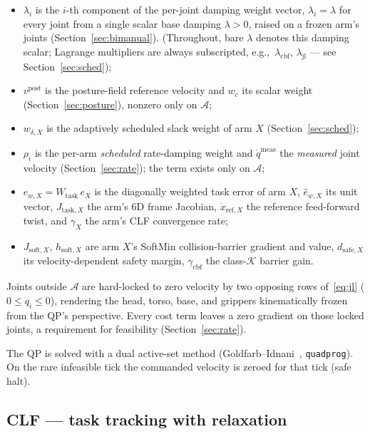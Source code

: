 \documentclass[12pt,a4paper,twoside,openright]{report}
\newcommand{\qdot}{\dot{q}}
\begin{document}
\begin{itemize}[nosep]
\item $\lambda_i$ is the $i$-th component of the per-joint damping weight vector, $\lambda_i = \lambda$ for every joint from a single scalar base damping $\lambda > 0$, raised on a frozen arm's joints (Section~\ref{sec:bimanual}). (Throughout, bare $\lambda$ denotes this damping scalar; Lagrange multipliers are always subscripted, e.g.,\ $\lambda_{\text{cbf}}$, $\lambda_{\text{jl}}$ --- see Section~\ref{sec:sched});
\item $v^{\text{post}}$ is the posture-field reference velocity and $w_c$ its scalar weight (Section~\ref{sec:posture}), nonzero only on $\mathcal{A}$;
\item $w_{\delta,X}$ is the adaptively scheduled slack weight of arm $X$ (Section~\ref{sec:sched});
\item $\rho_i$ is the per-arm \emph{scheduled} rate-damping weight and $\qdot^{\text{meas}}$ the \emph{measured} joint velocity (Section~\ref{sec:rate}); the term exists only on $\mathcal{A}$;
\item $e_{w,X} = W_{\text{task}}\,e_X$ is the diagonally weighted task error of arm $X$, $\hat{e}_{w,X}$ its unit vector, $J_{\text{task},X}$ the arm's 6D frame Jacobian, $\dot{x}_{\text{ref},X}$ the reference feed-forward twist, and $\gamma_X$ the arm's CLF convergence rate;
\item $J_{\text{soft},X}$, $h_{\text{soft},X}$ are arm $X$'s SoftMin collision-barrier gradient and value, $d_{\text{safe},X}$ its velocity-dependent safety margin, $\gamma_{\text{cbf}}$ the class-$\mathcal{K}$ barrier gain.
\end{itemize}
Joints outside $\mathcal{A}$ are hard-locked to zero velocity by two opposing rows of~\eqref{eq:jl} ($0 \le \qdot_i \le 0$), rendering the head, torso, base, and grippers kinematically frozen from the QP's perspective. Every cost term leaves a zero gradient on those locked joints, a requirement for feasibility (Section~\ref{sec:rate}).

The QP is solved with a dual active-set method (Goldfarb--Idnani~\cite{goldfarb1983}, \texttt{quadprog}). On the rare infeasible tick the commanded velocity is zeroed for that tick (safe halt).

\subsection{CLF --- task tracking with relaxation}
\label{sec:clf}
\end{document}

